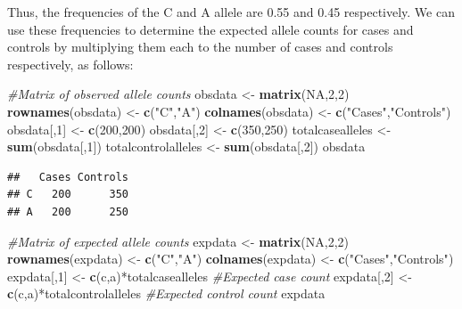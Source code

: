 \documentclass[]{article}
\newenvironment{Shaded}{\begin{snugshade}}{\end{snugshade}}
\newcommand{\KeywordTok}[1]{\textcolor[rgb]{0.13,0.29,0.53}{\textbf{{#1}}}}
\newcommand{\DecValTok}[1]{\textcolor[rgb]{0.00,0.00,0.81}{{#1}}}
\newcommand{\StringTok}[1]{\textcolor[rgb]{0.31,0.60,0.02}{{#1}}}
\newcommand{\CommentTok}[1]{\textcolor[rgb]{0.56,0.35,0.01}{\textit{{#1}}}}
\newcommand{\OtherTok}[1]{\textcolor[rgb]{0.56,0.35,0.01}{{#1}}}
\newcommand{\NormalTok}[1]{{#1}}
\begin{document}
Thus, the frequencies of the C and A allele are 0.55 and 0.45
respectively. We can use these frequencies to determine the expected
allele counts for cases and controls by multiplying them each to the
number of cases and controls respectively, as follows:

\begin{Shaded}
\begin{Highlighting}[]
\CommentTok{#Matrix of observed allele counts}
\NormalTok{obsdata <-}\StringTok{ }\KeywordTok{matrix}\NormalTok{(}\OtherTok{NA}\NormalTok{,}\DecValTok{2}\NormalTok{,}\DecValTok{2}\NormalTok{)}
\KeywordTok{rownames}\NormalTok{(obsdata) <-}\StringTok{ }\KeywordTok{c}\NormalTok{(}\StringTok{"C"}\NormalTok{,}\StringTok{"A"}\NormalTok{)}
\KeywordTok{colnames}\NormalTok{(obsdata) <-}\StringTok{ }\KeywordTok{c}\NormalTok{(}\StringTok{"Cases"}\NormalTok{,}\StringTok{"Controls"}\NormalTok{)}
\NormalTok{obsdata[,}\DecValTok{1}\NormalTok{] <-}\StringTok{ }\KeywordTok{c}\NormalTok{(}\DecValTok{200}\NormalTok{,}\DecValTok{200}\NormalTok{)}
\NormalTok{obsdata[,}\DecValTok{2}\NormalTok{] <-}\StringTok{ }\KeywordTok{c}\NormalTok{(}\DecValTok{350}\NormalTok{,}\DecValTok{250}\NormalTok{)}
\NormalTok{totalcasealleles <-}\StringTok{ }\KeywordTok{sum}\NormalTok{(obsdata[,}\DecValTok{1}\NormalTok{])}
\NormalTok{totalcontrolalleles <-}\StringTok{ }\KeywordTok{sum}\NormalTok{(obsdata[,}\DecValTok{2}\NormalTok{])}
\NormalTok{obsdata}
\end{Highlighting}
\end{Shaded}

\begin{verbatim}
##   Cases Controls
## C   200      350
## A   200      250
\end{verbatim}

\pagebreak

\begin{Shaded}
\begin{Highlighting}[]
\CommentTok{#Matrix of expected allele counts}
\NormalTok{expdata <-}\StringTok{ }\KeywordTok{matrix}\NormalTok{(}\OtherTok{NA}\NormalTok{,}\DecValTok{2}\NormalTok{,}\DecValTok{2}\NormalTok{)}
\KeywordTok{rownames}\NormalTok{(expdata) <-}\StringTok{ }\KeywordTok{c}\NormalTok{(}\StringTok{"C"}\NormalTok{,}\StringTok{"A"}\NormalTok{)}
\KeywordTok{colnames}\NormalTok{(expdata) <-}\StringTok{ }\KeywordTok{c}\NormalTok{(}\StringTok{"Cases"}\NormalTok{,}\StringTok{"Controls"}\NormalTok{)}
\NormalTok{expdata[,}\DecValTok{1}\NormalTok{] <-}\StringTok{ }\KeywordTok{c}\NormalTok{(c,a)*totalcasealleles            }\CommentTok{#Expected case count}
\NormalTok{expdata[,}\DecValTok{2}\NormalTok{] <-}\StringTok{ }\KeywordTok{c}\NormalTok{(c,a)*totalcontrolalleles         }\CommentTok{#Expected control count}
\NormalTok{expdata}
\end{Highlighting}
\end{Shaded}
\end{document}
